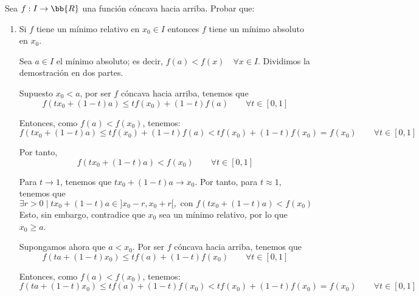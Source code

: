 \begin{ejercicio}
    Sea $f:I\to \bb{R}$ una función cóncava hacia arriba. Probar que:
    \begin{enumerate}
        \item Si $f$ tiene un mínimo relativo en $x_0\in I$ entonces $f$ tiene un mínimo absoluto en $x_0$.

        Sea $a\in I$ el mínimo absoluto; es decir, $f(a)<f(x)\quad \forall x\in I$. Dividimos la demostración en dos partes.
        
        Supuesto $x_0 < a$, por ser $f$ cóncava hacia arriba, tenemos que
        \begin{equation*}
            f(tx_0 + (1-t)a) \leq tf(x_0) + (1-t)f(a) \qquad \forall t\in [0,1] 
        \end{equation*}

        Entonces, como $f(a)<f(x_0)$, tenemos:
        \begin{equation*}
            f(tx_0 + (1-t)a) \leq tf(x_0) + (1-t)f(a) < tf(x_0) + (1-t)f(x_0) = f(x_0)\qquad \forall t\in [0,1] 
        \end{equation*}

        Por tanto,
        \begin{equation*}
            f(tx_0 + (1-t)a) < f(x_0)\qquad \forall t\in [0,1] 
        \end{equation*}

        Para $t\to 1$, tenemos que $tx_0 + (1-t)a \to x_0$. Por tanto, para $t\approx 1$, tenemos que
        \begin{equation*}
            \exists r>0 \mid tx_0+(1-t)a \in ]x_0-r, x_0+r[, \text{ con }
            f(tx_0 + (1-t)a) < f(x_0)
        \end{equation*}
        Esto, sin embargo, contradice que $x_0$ sea un mínimo relativo, por lo que $x_0\geq a$.

        Supongamos ahora que $a<x_0$. Por ser $f$ cóncava hacia arriba, tenemos que
        \begin{equation*}
            f(ta + (1-t)x_0) \leq tf(a) + (1-t)f(x_0) \qquad \forall t\in [0,1] 
        \end{equation*}

        Entonces, como $f(a)<f(x_0)$, tenemos:
        \begin{equation*}
            f(ta + (1-t)x_0) \leq tf(a) + (1-t)f(x_0) < tf(x_0) + (1-t)f(x_0) = f(x_0) \qquad \forall t\in [0,1] 
        \end{equation*}


\end{enumerate}
\end{ejercicio}
